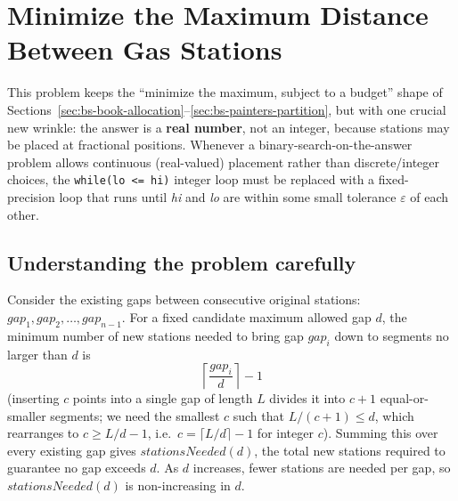 \section{Minimize the Maximum Distance Between Gas Stations}
\label{sec:bs-gas-stations}


\begin{patternbox}
This problem keeps the ``minimize the maximum, subject to a budget''
shape of Sections~\ref{sec:bs-book-allocation}--\ref{sec:bs-painters-partition},
but with one crucial new wrinkle: the answer is a \textbf{real number},
not an integer, because stations may be placed at fractional positions.
Whenever a binary-search-on-the-answer problem allows continuous
(real-valued) placement rather than discrete/integer choices, the
\texttt{while(lo <= hi)} integer loop must be replaced with a
fixed-precision loop that runs until \textit{hi} and \textit{lo} are
within some small tolerance $\varepsilon$ of each other.
\end{patternbox}

\subsection*{Understanding the problem carefully}

Consider the existing gaps between consecutive original stations:
$\textit{gap}_1, \textit{gap}_2, \dots, \textit{gap}_{n-1}$. For a fixed
candidate maximum allowed gap $d$, the minimum number of new stations
needed to bring gap $\textit{gap}_i$ down to segments no larger than $d$
is
\[
  \left\lceil \frac{\textit{gap}_i}{d} \right\rceil - 1
\]
(inserting $c$ points into a single gap of length $L$ divides it into
$c+1$ equal-or-smaller segments; we need the smallest $c$ such that
$L/(c+1) \le d$, which rearranges to $c \ge L/d - 1$, i.e.\ $c = \lceil
L/d \rceil - 1$ for integer $c$). Summing this over every existing gap
gives $\textit{stationsNeeded}(d)$, the total new stations required to
guarantee no gap exceeds $d$. As $d$ increases, fewer stations are needed
per gap, so $\textit{stationsNeeded}(d)$ is non-increasing in $d$.

